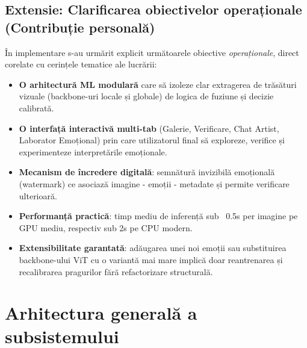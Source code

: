 \subsection*{Extensie: Clarificarea obiectivelor operaționale (Contribuție personală)}
În implementare s-au urmărit explicit următoarele obiective \emph{operaționale}, direct corelate cu cerințele tematice ale lucrării:
\begin{itemize}
  \item \textbf{O arhitectură ML modulară} care să izoleze clar extragerea de trăsături vizuale (backbone-uri locale și globale) de logica de fuziune și decizie calibrată.
  \item \textbf{O interfață interactivă multi-tab} (Galerie, Verificare, Chat Artist, Laborator Emoțional) prin care utilizatorul final să exploreze, verifice și experimenteze interpretările emoționale.
  \item \textbf{Mecanism de încredere digitală}: semnătură invizibilă emoțională (watermark) ce asociază imagine - emoții - metadate și permite verificare ulterioară.
  \item \textbf{Performanță practică}: timp mediu de inferență sub ~0.5s per imagine pe GPU mediu, respectiv sub 2s pe CPU modern.
  \item \textbf{Extensibilitate garantată}: adăugarea unei noi emoții sau substituirea backbone-ului ViT cu o variantă mai mare implică doar reantrenarea și recalibrarea pragurilor fără refactorizare structurală.
\end{itemize}

\section{Arhitectura generală a subsistemului}
\label{sec:schema_generala}

